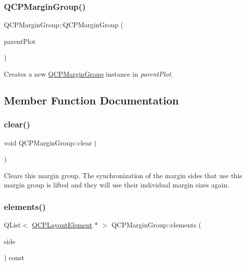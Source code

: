 \subsubsection{\texorpdfstring{Q\+C\+P\+Margin\+Group()}{QCPMarginGroup()}}
{\footnotesize\ttfamily Q\+C\+P\+Margin\+Group\+::\+Q\+C\+P\+Margin\+Group (\begin{DoxyParamCaption}\item[{\hyperlink{class_q_custom_plot}{Q\+Custom\+Plot} $\ast$}]{parent\+Plot }\end{DoxyParamCaption})\hspace{0.3cm}{\ttfamily [explicit]}}

Creates a new \hyperlink{class_q_c_p_margin_group}{Q\+C\+P\+Margin\+Group} instance in {\itshape parent\+Plot}. 

\subsection{Member Function Documentation}
\mbox{\label{class_q_c_p_margin_group_a144b67f216e4e86c3a3a309e850285fe}} 
\subsubsection{\texorpdfstring{clear()}{clear()}}
{\footnotesize\ttfamily void Q\+C\+P\+Margin\+Group\+::clear (\begin{DoxyParamCaption}{ }\end{DoxyParamCaption})}

Clears this margin group. The synchronization of the margin sides that use this margin group is lifted and they will use their individual margin sizes again. \mbox{\label{class_q_c_p_margin_group_ac967a4dc5fe02ae44aeb43511d5e1bd4}} 
\subsubsection{\texorpdfstring{elements()}{elements()}}
{\footnotesize\ttfamily Q\+List$<$ \hyperlink{class_q_c_p_layout_element}{Q\+C\+P\+Layout\+Element} $\ast$ $>$ Q\+C\+P\+Margin\+Group\+::elements (\begin{DoxyParamCaption}\item[{\hyperlink{namespace_q_c_p_a7e487e3e2ccb62ab7771065bab7cae54}{Q\+C\+P\+::\+Margin\+Side}}]{side }\end{DoxyParamCaption}) const\hspace{0.3cm}{\ttfamily [inline]}}

